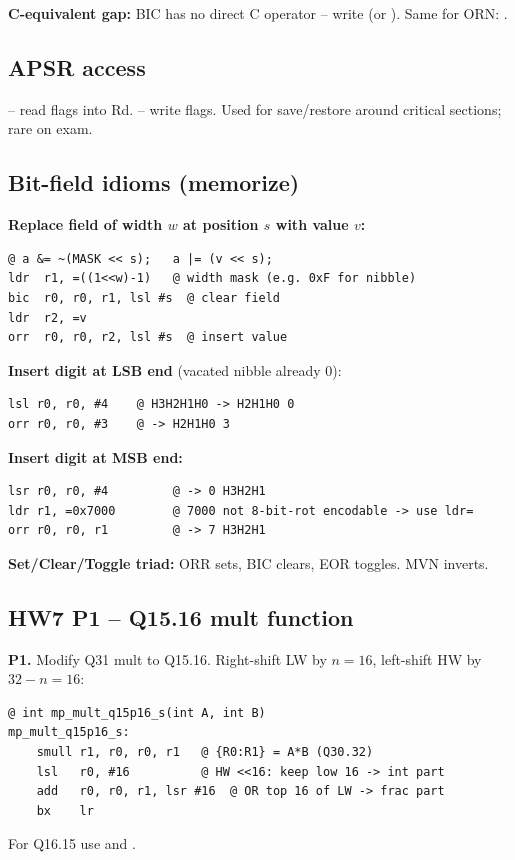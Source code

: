 \textbf{C-equivalent gap:} BIC has no direct C operator -- write  (or ). Same for ORN: .

\subsection{APSR access}
 -- read flags into Rd.  -- write flags. Used for save/restore around critical sections; rare on exam.

\subsection{Bit-field idioms (memorize)}
\textbf{Replace field of width $w$ at position $s$ with value $v$:}
\begin{lstlisting}
@ a &= ~(MASK << s);   a |= (v << s);
ldr  r1, =((1<<w)-1)   @ width mask (e.g. 0xF for nibble)
bic  r0, r0, r1, lsl #s  @ clear field
ldr  r2, =v
orr  r0, r0, r2, lsl #s  @ insert value
\end{lstlisting}
\textbf{Insert digit at LSB end} (vacated nibble already 0):
\begin{lstlisting}
lsl r0, r0, #4    @ H3H2H1H0 -> H2H1H0 0
orr r0, r0, #3    @ -> H2H1H0 3
\end{lstlisting}
\textbf{Insert digit at MSB end:}
\begin{lstlisting}
lsr r0, r0, #4         @ -> 0 H3H2H1
ldr r1, =0x7000        @ 7000 not 8-bit-rot encodable -> use ldr=
orr r0, r0, r1         @ -> 7 H3H2H1
\end{lstlisting}
\textbf{Set/Clear/Toggle triad:} ORR sets, BIC clears, EOR toggles. MVN inverts.

\subsection{HW7 P1 -- Q15.16 mult function}
\begin{hwp}\textbf{P1.} Modify Q31 mult to Q15.16. Right-shift LW by $n{=}16$, left-shift HW by $32{-}n{=}16$:
\begin{lstlisting}
@ int mp_mult_q15p16_s(int A, int B)
mp_mult_q15p16_s:
    smull r1, r0, r0, r1   @ {R0:R1} = A*B (Q30.32)
    lsl   r0, #16          @ HW <<16: keep low 16 -> int part
    add   r0, r0, r1, lsr #16  @ OR top 16 of LW -> frac part
    bx    lr
\end{lstlisting}
For Q16.15 use  and .
\end{hwp}

